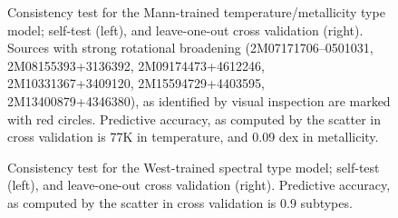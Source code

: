 \documentclass[modern]{aastex62}
\begin{document}
\begin{figure}[ht]
	\caption{Consistency test for the Mann-trained temperature/metallicity type model; self-test (left), and leave-one-out cross validation (right). Sources with strong rotational broadening (2M07171706--0501031, 2M08155393+3136392, 2M09174473+4612246, 2M10331367+3409120, 2M15594729+4403595, 2M13400879+4346380), as identified by visual inspection are marked with red circles. Predictive accuracy, as computed by the scatter in cross validation is 77K in temperature, and 0.09 dex in metallicity.}\label{fig:mann_validation}
\end{figure}

\begin{figure}[ht]
	\begin{center}
	\end{center}
	\caption{Consistency test for the West-trained spectral type model; self-test (left), and leave-one-out cross validation (right).  Predictive accuracy, as computed by the scatter in cross validation is 0.9 subtypes.}\label{fig:west_validation}
\end{figure}
\end{document}
